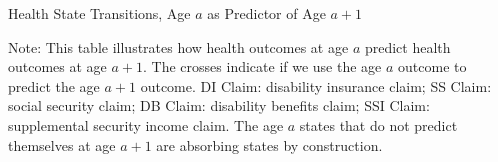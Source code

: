 \begin{table}
\begin{threeparttable}
\caption{Health State Transitions, Age $a$ as Predictor of Age $a+1$}\label{table:transition}
\scriptsize

{\flushleft\footnotesize
Note: This table illustrates how health outcomes at age $a$ predict health outcomes at age $a+1$. The crosses indicate if we use the age $a$ outcome to predict the age $a+1$ outcome. DI Claim: disability insurance claim; SS Claim: social security claim; DB Claim: disability benefits claim; SSI Claim: supplemental security income claim. The age $a$ states that do not predict themselves at age $a+1$ are absorbing states by construction.}
\end{threeparttable}
\end{table}

%


